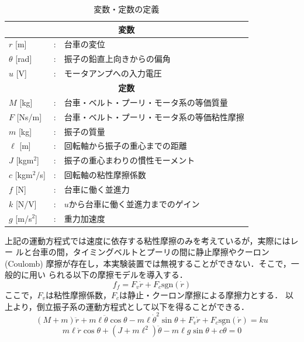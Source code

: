\begin{table}[htbp!]
 \begin{center}
  \caption{変数・定数の定義}
  \label{tbl:para}
  \begin{tabular}{lcl}\hline
   \multicolumn{3}{c}{\bf 変数} \\ \hline
   $r$ [m] & : & 台車の変位 \\
   $\theta$ [rad] & : & 振子の鉛直上向きからの偏角 \\
   $u$ [V] & : & モータアンプへの入力電圧 \\ \hline
   \multicolumn{3}{c}{\bf 定数} \\ \hline
   $M$ [kg] & : & 台車・ベルト・プーリ・モータ系の等価質量 \\
   $F$ [Ns/m] & : & 台車・ベルト・プーリ・モータ系の等価粘性摩擦 \\
   $m$ [kg] & : & 振子の質量 \\
   $\ell$ [m] & : & 回転軸から振子の重心までの距離 \\
   $J$ [kgm$^2$] & : & 振子の重心まわりの慣性モーメント \\
   $c$ [kgm$^2$/s] & : & 回転軸の粘性摩擦係数 \\
   $f$ [N] & : & 台車に働く並進力 \\
   $k$ [N/V] & : & $u$から台車に働く並進力までのゲイン \\
   $g$ [m/s$^2$] & : & 重力加速度 \\ \hline
  \end{tabular}
 \end{center}
\end{table}

上記の運動方程式では速度に依存する粘性摩擦のみを考えているが，実際にはレー
ルと台車の間，タイミングベルトとプーリの間に静止摩擦やクーロン(Coulomb)
摩擦が存在し，本実験装置では無視することができない．そこで，一般的に用い
られる以下の摩擦モデルを導入する．
\[
 f_f = F_v \dot{r} + F_c \mbox{sgn}(\dot{r})
\]
ここで，$F_v$は粘性摩擦係数，$F_c$は静止・クーロン摩擦による摩擦力とする．
以上より，倒立振子系の運動方程式として以下を得ることができる．
\begin{equation}
 (M + m)\ddot{r} + m\ell\ddot{\theta}\cos\theta
  - m\ell\dot{\theta}^2\sin\theta +
 F_v \dot{r} + F_c \mbox{sgn}(\dot{r}) = ku
 \label{eq:heishin}
\end{equation}
\begin{equation}
 m\ell\ddot{r}\cos\theta + (J + m\ell^2)\ddot{\theta}
  - m\ell g \sin\theta + c\dot{\theta} = 0
 \label{eq:kaiten}
\end{equation}
